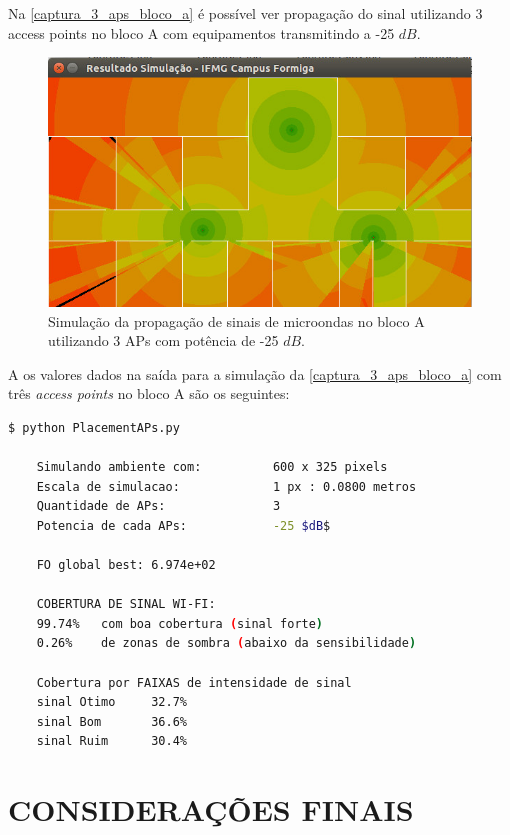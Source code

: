 \documentclass[
	12pt,				%
	twoside,			%
	a4paper,			%
	english,			%
	french,				%
	spanish,			%
	brazil				%
	]{abntex2}
\begin{document}
Na \autoref{captura_3_aps_bloco_a} é possível ver propagação do sinal
utilizando 3 access points no bloco A com equipamentos transmitindo a
-25 \(dB\).

\begin{figure}[ht]
    \caption{\label{captura_3_aps_bloco_a} Simulação da propagação de sinais de microondas no bloco A utilizando 3 APs com potência de -25 $dB$.
    }
    \begin{center}
        \includegraphics[scale=0.7]{imagens/captura-3-aps-bloco-a.jpg}
    \end{center}
\end{figure}

A os valores dados na saída para a simulação da
\autoref{captura_3_aps_bloco_a} com três \emph{access points} no bloco A
são os seguintes:

\begin{lstlisting}[language=bash]
    $ python PlacementAPs.py 
    
    Simulando ambiente com:          600 x 325 pixels
    Escala de simulacao:             1 px : 0.0800 metros
    Quantidade de APs:               3
    Potencia de cada APs:            -25 $dB$
    
    FO global best: 6.974e+02
    
    COBERTURA DE SINAL WI-FI:
    99.74%   com boa cobertura (sinal forte)
    0.26%    de zonas de sombra (abaixo da sensibilidade)
    
    Cobertura por FAIXAS de intensidade de sinal
    sinal Otimo     32.7%
    sinal Bom       36.6%
    sinal Ruim      30.4%
\end{lstlisting}

\chapter{CONSIDERAÇÕES FINAIS}\label{considerauxe7uxf5es-finais}
\end{document}
